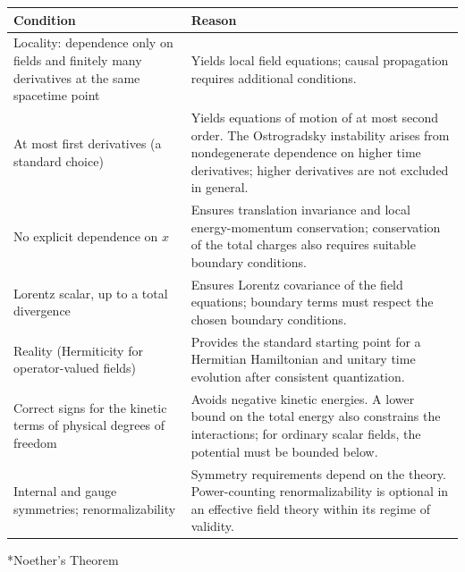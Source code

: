 \documentclass[11pt,a4paper]{article}
\makeatletter
\renewcommand\subsubsection{\@startsection{subsubsection}{3}{\z@}{-3.25ex\@plus-1ex\@minus-.2ex}{1.5ex\@plus.2ex}{\normalfont\normalsize\bfseries\boldmath}}
\makeatother
\begin{document}
\begingroup
\renewcommand{\arraystretch}{1.2}
\begin{xltabular}{\linewidth}{>{\raggedright\arraybackslash{}\hsize}X>{\raggedright\arraybackslash{}\hsize}X}
\toprule
Condition & Reason \\
\midrule
\endhead
\bottomrule
\endlastfoot
Locality: dependence only on fields and finitely many derivatives at the same spacetime point & Yields local field equations; causal propagation requires additional conditions. \\
\addlinespace
At most first derivatives (a standard choice) & Yields equations of motion of at most second order. The Ostrogradsky instability arises from nondegenerate dependence on higher time derivatives; higher derivatives are not excluded in general. \\
\addlinespace
No explicit dependence on $x$ & Ensures translation invariance and local energy-momentum conservation; conservation of the total charges also requires suitable boundary conditions. \\
\addlinespace
Lorentz scalar, up to a total divergence & Ensures Lorentz covariance of the field equations; boundary terms must respect the chosen boundary conditions. \\
\addlinespace
Reality (Hermiticity for operator-valued fields) & Provides the standard starting point for a Hermitian Hamiltonian and unitary time evolution after consistent quantization. \\
\addlinespace
Correct signs for the kinetic terms of physical degrees of freedom & Avoids negative kinetic energies. A lower bound on the total energy also constrains the interactions; for ordinary scalar fields, the potential must be bounded below. \\
\addlinespace
Internal and gauge symmetries; renormalizability & Symmetry requirements depend on the theory. Power-counting renormalizability is optional in an effective field theory within its regime of validity. \\
\end{xltabular}
\endgroup

\bigskip

\subsubsection*{Noether's Theorem}
\label{classical-noether}
\end{document}

